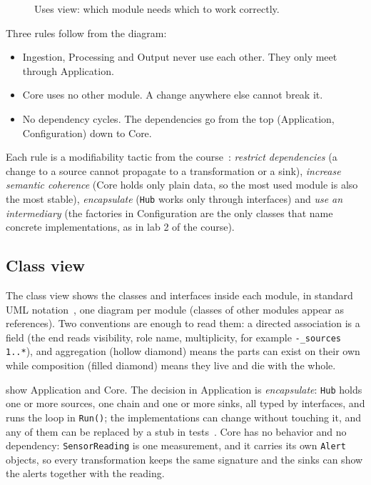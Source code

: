 \documentclass[../main-en.tex]{subfiles}
\begin{document}
\begin{figure}[htbp]
  \centering
  \caption{Uses view: which module needs which to work correctly.}
  \label{fig:uses-view}
\end{figure}

Three rules follow from the diagram:

\begin{itemize}
  \item Ingestion, Processing and Output never use each other. They only
  meet through Application.
  \item Core uses no other module. A change anywhere else cannot break it.
  \item No dependency cycles. The dependencies go from the top (Application,
  Configuration) down to Core.
\end{itemize}

Each rule is a modifiability tactic from the
course~\cite{wiklund_ch8_nodate}: \emph{restrict dependencies} (a change to
a source cannot propagate to a transformation or a sink), \emph{increase
semantic coherence} (Core holds only plain data, so the most used module is
also the most stable), \emph{encapsulate} (\texttt{Hub} works only through
interfaces) and \emph{use an intermediary} (the factories in Configuration
are the only classes that name concrete implementations, as in lab 2 of the
course).

\subsection{Class view}

The class view shows the classes and interfaces inside each module, in
standard UML notation~\cite{freecodecamp_uml_2021}, one diagram per module
(classes of other modules appear as references). Two conventions are enough
to read them: a directed association is a field (the end reads visibility,
role name, multiplicity, for example \texttt{-\_sources 1..*}), and
aggregation (hollow diamond) means the parts can exist on their own while
composition (filled diamond) means they live and die with the whole.

 show Application and Core. The
decision in Application is \emph{encapsulate}: \texttt{Hub} holds one or
more sources, one chain and one or more sinks, all typed by interfaces, and
runs the loop in \texttt{Run()}; the implementations can change without
touching it, and any of them can be replaced by a stub in
tests~\cite{wiklund_ch12_nodate}. Core has no behavior and no dependency:
\texttt{SensorReading} is one measurement, and it carries its own
\texttt{Alert} objects, so every transformation keeps the same signature and
the sinks can show the alerts together with the reading.
\end{document}
